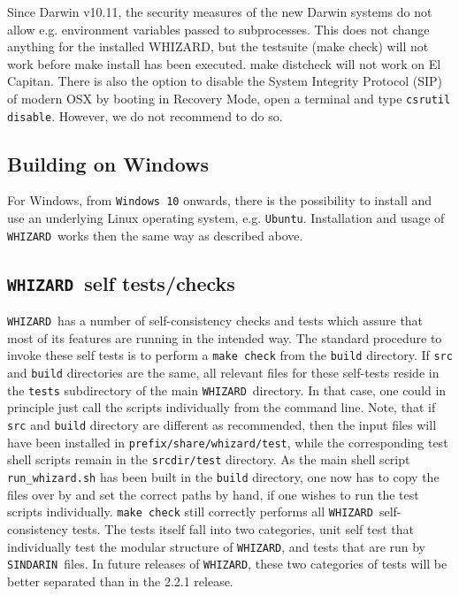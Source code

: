 \documentclass[12pt]{book}
\newcommand{\ttt}[1]{\texttt{#1}}
\newcommand{\whizard}{\ttt{WHIZARD}}
\newcommand{\sindarin}{\ttt{SINDARIN}}
\begin{document}
Since Darwin v10.11, the security measures of the new Darwin systems
do not allow e.g. environment variables passed to subprocesses. This
does not change anything for the installed WHIZARD, but the testsuite
(make check) will not work before make install has been executed. make
distcheck will not work on El Capitan. There is also the option to
disable the System Integrity Protocol (SIP) of modern OSX by booting
in Recovery Mode, open a terminal and type \ttt{csrutil
disable}. However, we do not recommend to do so.


\subsection{Building on Windows}

For Windows, from \ttt{Windows 10} onwards, there is the possibility
to install and use an underlying Linux operating system,
e.g. \ttt{Ubuntu}. Installation and usage of \whizard\ works then the
same way as described above.



\subsection{\whizard\ self tests/checks}
\label{sec:selftests}

\whizard\ has a number of self-consistency checks and tests which assure
that most of its features are running in the intended way. The
standard procedure to invoke these self tests is to perform a
\ttt{make check} from the \ttt{build} directory. If \ttt{src}
and \ttt{build} directories are the same, all relevant files for
these self-tests reside in the \ttt{tests} subdirectory of the main
\whizard\ directory. In that case, one could in principle just call the
scripts individually from the command line. Note, that if \ttt{src}
and \ttt{build} directory are different as recommended, then the
input files will have been installed in
\ttt{prefix/share/whizard/test}, while the corresponding test shell
scripts remain in the \ttt{srcdir/test} directory. As the main shell
script \ttt{run\_whizard.sh} has been built in the \ttt{build}
directory, one now has to copy the files over by and set the correct
paths by hand, if one wishes to run the test scripts individually.
\ttt{make check} still correctly performs all \whizard\
self-consistency tests. The tests itself fall into two categories,
unit self test that individually test the modular structure of
\whizard, and tests that are run by \sindarin\ files. In future releases
of \whizard, these two categories of tests will be better separated
than in the 2.2.1 release.
\end{document}
